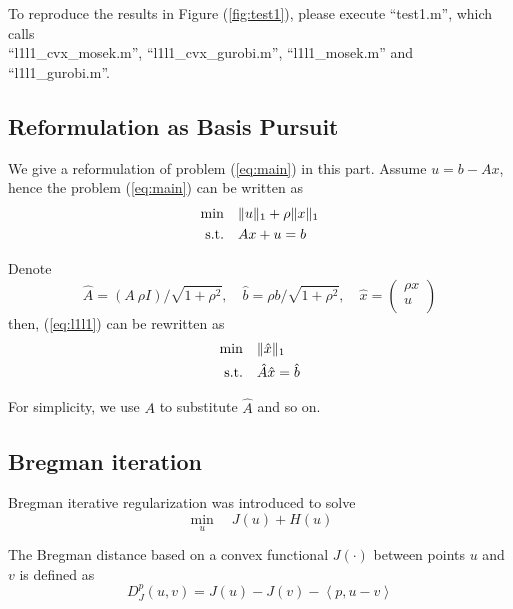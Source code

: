 \documentclass[conference,onecolumn,12pt]{IEEEtran}
\newcommand{\<}{\langle}
\renewcommand{\>}{\rangle}
\numberwithin{equation}{section}
\begin{document}
To reproduce the results in Figure (\ref{fig:test1}), please execute ``test1.m'', which calls \\``l1l1\_cvx\_mosek.m'', ``l1l1\_cvx\_gurobi.m'', ``l1l1\_mosek.m'' and ``l1l1\_gurobi.m''.



\subsection{Reformulation as Basis Pursuit}
We give a reformulation of problem (\ref{eq:main}) in this part. Assume $u=b-Ax$, hence the problem (\ref{eq:main}) can be written as
\begin{equation}
    \label{eq:l1l1}
    \begin{split}
        \min\quad &\|u\|_1+\rho\|x\|_1\\
        {\rm s.t.}\quad & Ax+u=b\\
    \end{split}
\end{equation}

Denote
\begin{equation}
    \label{eq:substitution}
    \hat{A} = \left(A\ \rho I\right)/\sqrt{1+\rho^2},\quad \hat{b}=\rho b/\sqrt{1+\rho^2},\quad \hat{x} = \left(\begin{matrix}
        \rho x\\
        u\\
    \end{matrix}\right)
\end{equation}
then, (\ref{eq:l1l1}) can be rewritten as
\begin{equation}
    \label{eq:l1min}
    \begin{split}
        \min\quad &\|\hat{x}\|_1\\
        {\rm s.t.}\quad &\hat{A}\hat{x}=\hat{b}\\
    \end{split}
\end{equation}

For simplicity, we use $A$ to substitute $\hat{A}$ and so on. 
\subsection{Bregman iteration}
Bregman iterative regularization was introduced to solve
\begin{equation}
    \label{basicbreg}
    \min_u \quad J(u)+H(u)
\end{equation}

The Bregman distance based on a convex functional $J(\cdot)$ between points $u$ and $v$ is defined as
\begin{equation}
    D_J^p(u,v) = J(u)-J(v)-\left<p,u-v\right>
\end{equation}
\end{document}
